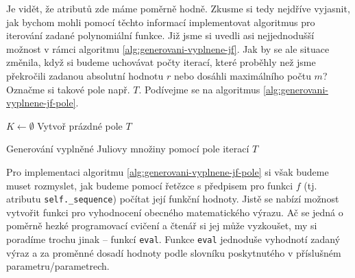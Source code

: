 Je vidět, že atributů zde máme poměrně hodně. Zkusme si tedy nejdříve vyjasnit, jak bychom mohli pomocí těchto informací implementovat algoritmus pro iterování zadané polynomiální funkce. Již jsme si uvedli asi nejjednodušší možnost v rámci algoritmu \ref{alg:generovani-vyplnene-jf}. Jak by se ale situace změnila, když si budeme uchovávat počty iterací, které proběhly než jsme překročili zadanou absolutní hodnotu $r$ nebo dosáhli maximálního počtu $m$? Označme si takové pole např. $T$. Podívejme se na algoritmus \ref{alg:generovani-vyplnene-jf-pole}.
\begin{algorithm}[h]
    $K\gets\emptyset$\;
    Vytvoř prázdné pole $T$\;
    \;
    \caption{Generování vyplněné Juliovy množiny pomocí pole iterací $T$}
    \label{alg:generovani-vyplnene-jf-pole}
\end{algorithm}
Pro implementaci algoritmu \ref{alg:generovani-vyplnene-jf-pole} si však budeme muset rozmyslet, jak budeme pomocí řetězce s předpisem pro funkci $f$ (tj. atributu \texttt{self.\_sequence}) počítat její funkční hodnoty. Jistě se nabízí možnost vytvořit funkci pro vyhodnocení obecného matematického výrazu. Ač se jedná o poměrně hezké programovací cvičení a čtenář si jej může vyzkoušet, my si poradíme trochu jinak -- funkcí \texttt{eval}. Funkce \texttt{eval} jednoduše vyhodnotí zadaný výraz a za proměnné dosadí hodnoty podle slovníku poskytnutého v příslušném parametru/parametrech.

